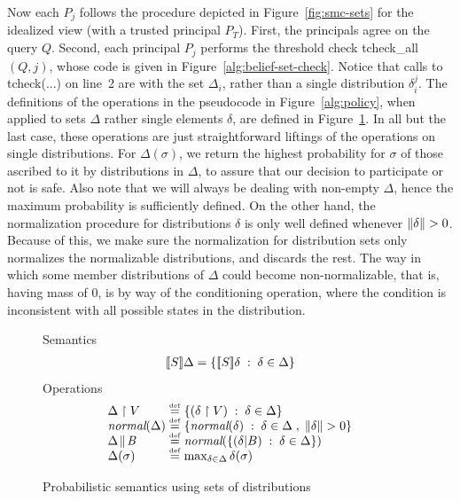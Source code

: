 \documentclass[10pt]{sigplanconf}
\newcommand{\polc}{\textsf{tcheck}}
\newcommand{\polcall}{\textsf{tcheck\_all}}
\begin{document}
Now each $P_j$ follows the procedure depicted in
Figure~\ref{fig:smc-sets} for the idealized view (with a trusted
principal $P_T$).  First, the principals agree on the query $Q$.
Second, each principal $P_j$ performs the threshold check
\polcall$(Q,j)$, whose code is given in Figure~\ref{alg:belief-set-check}.
Notice that calls to \polc(...) on line~2 are with the set $\Delta_i$, rather
than a single distribution $\delta_i^j$.  The definitions of the
operations in the pseudocode in Figure~\ref{alg:policy}, when applied
to sets $\Delta$ rather single elements $\delta$, are defined in
Figure~\ref{fig:sem-sets}.  In
all but the last case, these operations are just straightforward
liftings of the operations on single distributions.  For
$\Delta(\sigma)$, we return the highest probability for $\sigma$ of
those ascribed to it by distributions in $\Delta$, to assure that our
decision to participate or not is safe.  Also note that we will always
be dealing with non-empty $ \Delta $, hence the maximum probability is
sufficiently defined. On the other hand, the normalization procedure
for distributions $ \delta $ is only well defined whenever $
\mathord{\parallel}\delta\mathord{\parallel} > 0 $. Because of this, we make sure the normalization
for distribution sets only normalizes the normalizable distributions,
and discards the rest. The way in which some member distributions of $
\Delta $ could become non-normalizable, that is, having mass of $ 0 $,
is by way of the conditioning operation, where the condition is
inconsistent with all possible states in the distribution.

\begin{figure}
\centering
Semantics
\begin{displaymath}
\begin{array}{l}
[\![{S}]\!]{\Delta} = \{ [\![{S}]\!]{\delta} \;:\; \delta \in \Delta \} \\
\end{array}
\end{displaymath}
Operations
\begin{displaymath}
\begin{array}{l@{\;\defeq\;}l}
\project{\Delta}{V} & \{ (\project{\delta}{V}) \given \delta \in \Delta \} \\
\normal{\Delta} & \{
\normal{\delta} \given \delta \in \Delta \; , \; \pmass{\delta} >
0\} \\
\revise{\Delta}{\bexp} & \normal{\{
(\dcond{\delta}{B}) \given \delta \in \Delta \} } \\
\Delta(\sigma) & \max_{ \delta \in \Delta} \delta(\sigma) \\
\end{array}
\end{displaymath}
\caption{Probabilistic semantics using sets of distributions}
\label{fig:sem-sets}
\end{figure}
\end{document}
